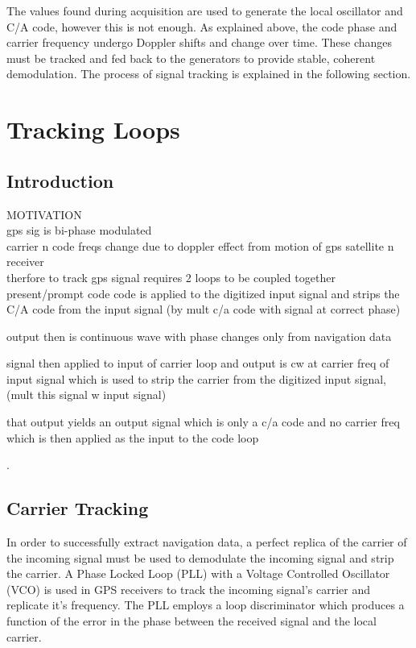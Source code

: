 \documentclass[11pt]{article}
\numberwithin{equation}{subsection}
\begin{document}
	The values found during acquisition are used to generate the local oscillator and C/A code, however this is not enough. As explained above, the code phase and carrier frequency undergo Doppler shifts and change over time. These changes must be tracked and fed back to the generators to provide stable, coherent demodulation. The process of signal tracking is explained in the following section.
	\section{Tracking Loops}
	
	\subsection{Introduction}
	MOTIVATION\\	
	
	gps sig is bi-phase modulated\\
	
	carrier n code freqs change due to doppler effect from motion of gps satellite n receiver\\
	
	therfore to track gps signal requires 2 loops to be coupled together\\
	
	present/prompt code  code is applied to the digitized input
	signal and strips the C/A code from the input signal (by mult c/a code with signal at correct phase)
	
	output then is continuous wave with phase changes only from navigation data
	
	signal then applied to input of carrier loop and output is cw at carrier freq of input signal which is used to  strip the carrier from the digitized input signal,
	(mult this signal w  input signal)
	
	that output yields an output signal which is only a c/a code and no carrier freq which is then applied as the input to the code loop 
	
	
	.
	
	
	\subsection{Carrier Tracking}
	
	In order to successfully extract navigation data, a perfect replica of the carrier of the incoming signal must be used to demodulate the incoming signal and strip the carrier.
	A Phase Locked Loop (PLL) with a Voltage Controlled Oscillator (VCO) is used in GPS receivers to track the incoming signal's carrier and replicate it's frequency. The PLL employs a loop discriminator which produces a function of the error in the phase between the received signal and the local carrier. \\
	
\end{document}
